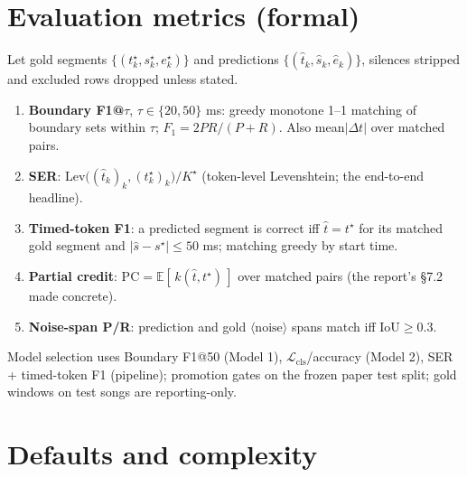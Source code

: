 \documentclass[10pt]{article}
\newcommand{\E}{\mathbb{E}}
\newcommand{\noise}{\langle\mathrm{noise}\rangle}
\begin{document}
\section{Evaluation metrics (formal)}\label{sec:metrics}

Let gold segments $\{(t^\star_k, s^\star_k, e^\star_k)\}$ and predictions $\{(\hat t_k, \hat s_k, \hat e_k)\}$, silences stripped and excluded rows dropped unless stated.
\begin{enumerate}
\item \textbf{Boundary F1@$\tau$}, $\tau \in \{20, 50\}$ ms: greedy monotone 1--1 matching of boundary sets within $\tau$; $F_1 = 2PR/(P{+}R)$. Also mean$|\Delta t|$ over matched pairs.
\item \textbf{SER}: $\mathrm{Lev}\big((\hat t_k)_k, (t^\star_k)_k\big) / K^\star$ (token-level Levenshtein; the end-to-end headline).
\item \textbf{Timed-token F1}: a predicted segment is correct iff $\hat t = t^\star$ for its matched gold segment and $|\hat s - s^\star| \le 50$ ms; matching greedy by start time.
\item \textbf{Partial credit}: $\mathrm{PC} = \E[\, k(\hat t, t^\star) \,]$ over matched pairs (the report's \S7.2 made concrete).
\item \textbf{Noise-span P/R}: prediction and gold $\noise$ spans match iff $\mathrm{IoU} \ge 0.3$.
\end{enumerate}
Model selection uses Boundary F1@50 (Model 1), $\mathcal{L}_{\mathrm{cls}}$/accuracy (Model 2), SER + timed-token F1 (pipeline); promotion gates on the frozen paper test split; gold windows on test songs are reporting-only.

\section{Defaults and complexity}
\end{document}
